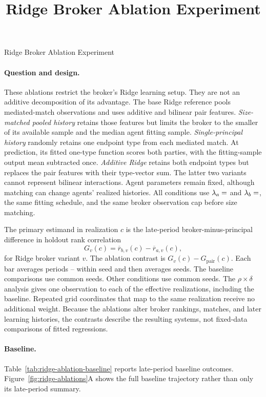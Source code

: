 \documentclass[11pt]{article}
\title{Ridge Broker Ablation Experiment}
\author{}
\date{}
\begin{document}
\renewcommand{\thefigure}{RA\arabic{figure}}
\renewcommand{\thetable}{RA\arabic{table}}
\begin{center}
{\LARGE Ridge Broker Ablation Experiment}
\end{center}
\vspace{0.75em}

\paragraph{Question and design.}
These  ablations restrict the broker's Ridge learning setup.
They are not an additive decomposition of its advantage. The base Ridge
reference pools mediated-match observations and uses additive and bilinear pair
features. \emph{Size-matched pooled history} retains those features but limits
the broker to the smaller of its available sample and the median agent fitting
sample. \emph{Single-principal history} randomly retains one endpoint type from
each mediated match. At prediction, its fitted one-type function scores both
parties, with the fitting-sample output mean subtracted once. \emph{Additive
Ridge} retains both endpoint types but replaces the pair features with their
type-vector sum. The latter two variants cannot represent bilinear interactions.
Agent parameters remain fixed, although matching can change agents' realized
histories. All conditions use $\lambda_a=\rav{ridgeLambdaAgent}$ and
$\lambda_b=\rav{ridgeLambdaBroker}$, the same fitting schedule, and the same
broker observation cap before size matching.

The primary estimand in realization $c$ is the late-period broker-minus-principal
difference in holdout rank correlation
\[
G_v(c)=\overline r_{b,v}(c)-\overline r_{a,v}(c),
\]
for Ridge broker variant $v$. The ablation contrast is
$G_v(c)-G_{\mathrm{pair}}(c)$. Each bar averages periods
-- within seed
and then averages seeds. The baseline comparisons use 
common seeds. Other conditions use  common seeds. The
$\rho\times\delta$ analysis gives one observation to each of the
 effective realizations, including the baseline. Repeated
grid coordinates that map to the same realization receive no additional
weight. Because the ablations alter broker rankings, matches, and later
learning histories, the contrasts describe the resulting systems, not
fixed-data comparisons of fitted regressions.

\paragraph{Baseline.}
Table~\ref{tab:ridge-ablation-baseline} reports late-period baseline outcomes.
Figure~\ref{fig:ridge-ablations}A shows the full baseline trajectory rather
than only its late-period summary.
\end{document}
